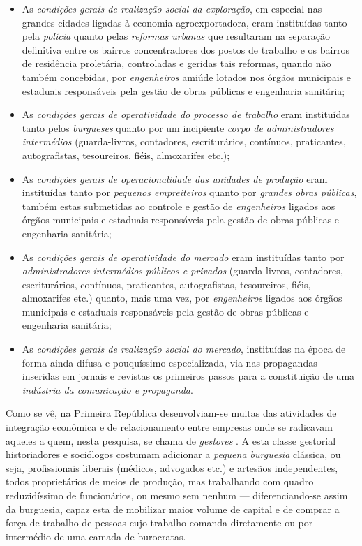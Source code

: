 \begin{itemize}
\item As \textit{condições gerais de realização social da exploração}, em especial nas grandes cidades ligadas à economia agroexportadora, eram instituídas tanto pela \textit{polícia} quanto pelas \textit{reformas urbanas} que resultaram na separação definitiva entre os bairros concentradores dos postos de trabalho e os bairros de residência proletária, controladas e geridas tais reformas, quando não também concebidas, por \textit{engenheiros} amiúde lotados nos órgãos municipais e estaduais responsáveis pela gestão de obras públicas e engenharia sanitária; 
\item As \textit{condições gerais de operatividade do processo de trabalho} eram instituídas tanto pelos \textit{burgueses} quanto por um incipiente \textit{corpo de administradores intermédios} (guarda-livros, contadores, escriturários, contínuos, praticantes, autografistas, tesoureiros, fiéis, almoxarifes etc.);
\item As \textit{condições gerais de operacionalidade das unidades de produção} eram instituídas tanto por \textit{pequenos empreiteiros} quanto por \textit{grandes obras públicas}, também estas submetidas ao controle e gestão de \textit{engenheiros} ligados aos órgãos municipais e estaduais responsáveis pela gestão de obras públicas e engenharia sanitária; 
\item As \textit{condições gerais de operatividade do mercado} eram instituídas tanto por \textit{administradores intermédios públicos e privados} (guarda-livros, contadores, escriturários, contínuos, praticantes, autografistas, tesoureiros, fiéis, almoxarifes etc.) quanto, mais uma vez, por \textit{engenheiros} ligados aos órgãos municipais e estaduais responsáveis pela gestão de obras públicas e engenharia sanitária; 
\item As \textit{condições gerais de realização social do mercado}, instituídas na época de forma ainda difusa e pouquíssimo especializada, via nas propagandas inseridas em jornais e revistas os primeiros passos para a constituição de uma \textit{indústria da comunicação e propaganda}.
\end{itemize}

Como se vê, na Primeira República desenvolviam-se muitas das atividades de integração econômica e de relacionamento entre empresas onde se radicavam aqueles a quem, nesta pesquisa, se chama de \textit{gestores}
. A esta classe gestorial historiadores e sociólogos costumam adicionar a \textit{pequena burguesia} clássica, ou seja, profissionais liberais (médicos, advogados etc.) e artesãos independentes, todos proprietários de meios de produção, mas trabalhando com quadro reduzidíssimo de funcionários, ou mesmo sem nenhum --- diferenciando-se assim da burguesia, capaz esta de mobilizar maior volume de capital e de comprar a força de trabalho de pessoas cujo trabalho comanda diretamente ou por intermédio de uma camada de burocratas.

